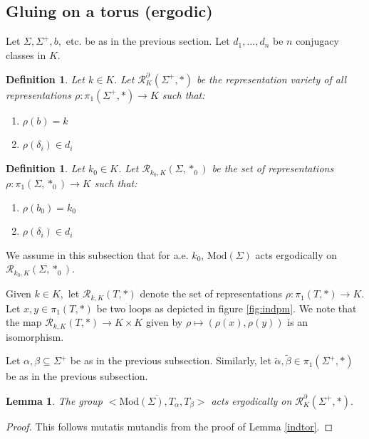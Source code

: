 \documentclass{article}
\newcommand{\Rc}{\mathcal{R}}
\newcommand{\Mod}{\textrm{Mod}}
\newtheorem{definition}[theorem]{Definition}
\newtheorem{lemma}{Lemma}[theorem]
\begin{document}
\subsection{Gluing on a torus (ergodic)}\label{gluetorerg}
    Let $\Sigma ,\Sigma^+, b,$ etc. be as in the previous section.
    Let $d_1, \dots, d_n$ be $n$ conjugacy classes in $K$.
    \begin{definition}
            Let $k \in K.$ Let $\Rc^{\partial}_K (\Sigma^+,*)$ be the representation variety of all representations $\rho : \pi_1(\Sigma^+, * ) \to K$ such that:
    \begin{enumerate}
        \item $\rho(b) =k$
        \item $\rho(\delta_i) \in d_i$
    \end{enumerate}
    \end{definition}

\begin{definition}
        Let $k_0 \in K$. Let $\Rc_{k_0,K}(\Sigma,*_0)$ be the set of representations $\rho: \pi_1(\Sigma, *_0) \to K$ such that:
    \begin{enumerate}
        \item $\rho(b_0) =k_0$
        \item $\rho(\delta_i) \in d_i$
    \end{enumerate}
\end{definition}
    


    We assume in this subsection that for a.e. $k_0$, $\Mod(\Sigma)$ acts ergodically on  $\Rc_{k_0, K}(\Sigma,*_0)$.

    Given $k \in K,$ let $\Rc_{k,K}(T,*)$ denote the set of representations $\rho:\pi_1(T, *) \to K.$
    Let $x,y \in \pi_1(T, *)$ be two loops as depicted in figure \ref{fig:indpm}.
    We note that the map $\Rc_{k,K}(T ,*) \to K \times K$ given by $\rho \mapsto (\rho(x), \rho(y))$ is an isomorphism.

    
    Let $\alpha, \beta \subseteq \Sigma^+$ be as in the previous subsection. Similarly, let $\tilde \alpha , \tilde \beta \in \pi_1(\Sigma^+, *)$ be as in the previous subsection.

    \begin{lemma}\label{glutorerg}
    The group $ \overline{<\Mod(\Sigma) , T_{\alpha} , T_{\beta}>}$ acts ergodically on $\Rc^{\partial}_K (\Sigma^+,*).$
\end{lemma}
\begin{proof}
    This follows mutatis mutandis from the proof of Lemma \ref{indtor}.
\end{proof}
    
\end{document}
